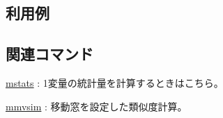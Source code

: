 \subsection*{利用例}

\subsection*{関連コマンド}
\hyperref[sect:mstats]{mstats} : 1変量の統計量を計算するときはこちら。

\hyperref[sect:mmvsim]{mmvsim} : 移動窓を設定した類似度計算。

%
